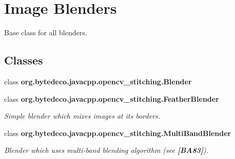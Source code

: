 \hypertarget{group__stitching__blend}{}\section{Image Blenders}
\label{group__stitching__blend}


Base class for all blenders.  


\subsection*{Classes}
\begin{DoxyCompactItemize}
\item 
class {\bfseries org.\+bytedeco.\+javacpp.\+opencv\+\_\+stitching.\+Blender}
\item 
class {\bfseries org.\+bytedeco.\+javacpp.\+opencv\+\_\+stitching.\+Feather\+Blender}
\begin{DoxyCompactList}\small\item\em Simple blender which mixes images at its borders. \end{DoxyCompactList}\item 
class {\bfseries org.\+bytedeco.\+javacpp.\+opencv\+\_\+stitching.\+Multi\+Band\+Blender}
\begin{DoxyCompactList}\small\item\em Blender which uses multi-\/band blending algorithm (see {\bfseries [B\+A83]}). \end{DoxyCompactList}\end{DoxyCompactItemize}
